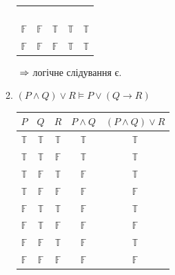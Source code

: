 \documentclass[a4paper,12pt]{article}
\begin{document}
\begin{enumerate}
\begin{enumerate}
\begin{table}[!htb]
\begin{minipage}{.4\linewidth}
\begin{tabular}{|c|c|c|c|c|}
\rowcolor[HTML]{FFCCC9} 
             &              &              &              &                \\
\rowcolor[HTML]{FFCCC9} 
             &              &              &              &                \\
\rowcolor[HTML]{FFCCC9} 
             &              &              &              &                \\
\rowcolor[HTML]{FFCCC9} 
             &              &              &              &                \\
$\mathbb{F}$ & $\mathbb{F}$ & $\mathbb{T}$ & $\mathbb{T}$ & $\mathbb{T}$   \\
$\mathbb{F}$ & $\mathbb{F}$ & $\mathbb{F}$ & $\mathbb{T}$ & $\mathbb{T}$  \\\hline
\end{tabular}    
\end{minipage} 
\end{table} $\\\Rightarrow$ логічне слідування є.
\item $(P\land Q)\lor R\models P\lor (Q\rightarrow R)$\begin{table}[!htb]\centering

    \begin{minipage}{.4\linewidth}

      \centering
        \begin{tabular}{|c|c|c|c|c|}\hline
$P$          & $Q$          & $R$          & $P\land Q$   & $(P\land Q)\lor R$                   \\\hline
$\mathbb{T}$ & $\mathbb{T}$ & $\mathbb{T}$ & $\mathbb{T}$ & $\mathbb{T}$                         \\
$\mathbb{T}$ & $\mathbb{T}$ & $\mathbb{F}$ & $\mathbb{T}$ & $\mathbb{T}$                         \\
$\mathbb{T}$ & $\mathbb{F}$ & $\mathbb{T}$ & $\mathbb{F}$ & $\mathbb{T}$                         \\
$\mathbb{T}$ & $\mathbb{F}$ & $\mathbb{F}$ & $\mathbb{F}$ & \cellcolor[HTML]{FFCCC9}$\mathbb{F}$ \\
$\mathbb{F}$ & $\mathbb{T}$ & $\mathbb{T}$ & $\mathbb{F}$ & $\mathbb{T}$                         \\
$\mathbb{F}$ & $\mathbb{T}$ & $\mathbb{F}$ & $\mathbb{F}$ & \cellcolor[HTML]{FFCCC9}$\mathbb{F}$ \\
$\mathbb{F}$ & $\mathbb{F}$ & $\mathbb{T}$ & $\mathbb{F}$ & $\mathbb{T}$                         \\
$\mathbb{F}$ & $\mathbb{F}$ & $\mathbb{F}$ & $\mathbb{F}$ & \cellcolor[HTML]{FFCCC9}$\mathbb{F}$ \\\hline
\end{tabular}
    \end{minipage}%
    \begin{minipage}{.4\linewidth}
      \centering


\end{minipage}
\end{table}
\end{enumerate}
\end{enumerate}
\end{document}
